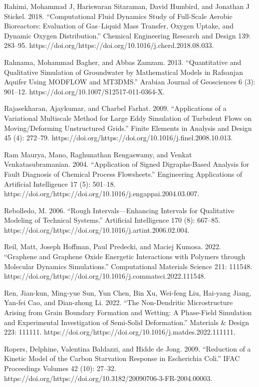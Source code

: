 \documentclass[utf8]{gradu3}
\begin{document}
Rahimi, Mohammad J, Hariswaran Sitaraman, David Humbird, and Jonathan J Stickel. 2018. “Computational Fluid Dynamics Study of Full-Scale Aerobic Bioreactors: Evaluation of Gas–Liquid Mass Transfer, Oxygen Uptake, and Dynamic Oxygen Distribution.” Chemical Engineering Research and Design 139: 283–95. https://doi.org/https://doi.org/10.1016/j.cherd.2018.08.033.

Rahnama, Mohammad Bagher, and Abbas Zamzam. 2013. “Quantitative and Qualitative Simulation of Groundwater by Mathematical Models in Rafsanjan Aquifer Using MODFLOW and MT3DMS.” Arabian Journal of Geosciences 6 (3): 901–12. https://doi.org/10.1007/S12517-011-0364-X.

Rajasekharan, Ajaykumar, and Charbel Farhat. 2009. “Applications of a Variational Multiscale Method for Large Eddy Simulation of Turbulent Flows on Moving/Deforming Unstructured Grids.” Finite Elements in Analysis and Design 45 (4): 272–79. https://doi.org/https://doi.org/10.1016/j.finel.2008.10.013.

Ram Maurya, Mano, Raghunathan Rengaswamy, and Venkat Venkatasubramanian. 2004. “Application of Signed Digraphs-Based Analysis for Fault Diagnosis of Chemical Process Flowsheets.” Engineering Applications of Artificial Intelligence 17 (5): 501–18. https://doi.org/https://doi.org/10.1016/j.engappai.2004.03.007.

Rebolledo, M. 2006. “Rough Intervals—Enhancing Intervals for Qualitative Modeling of Technical Systems.” Artificial Intelligence 170 (8): 667–85. https://doi.org/https://doi.org/10.1016/j.artint.2006.02.004.

Reil, Matt, Joseph Hoffman, Paul Predecki, and Maciej Kumosa. 2022. “Graphene and Graphene Oxide Energetic Interactions with Polymers through Molecular Dynamics Simulations.” Computational Materials Science 211: 111548. https://doi.org/https://doi.org/10.1016/j.commatsci.2022.111548.

Ren, Jian-kun, Ming-yue Sun, Yun Chen, Bin Xu, Wei-feng Liu, Hai-yang Jiang, Yan-fei Cao, and Dian-zhong Li. 2022. “The Non-Dendritic Microstructure Arising from Grain Boundary Formation and Wetting: A Phase-Field Simulation and Experimental Investigation of Semi-Solid Deformation.” Materials \& Design 223: 111111. https://doi.org/https://doi.org/10.1016/j.matdes.2022.111111.

Ropers, Delphine, Valentina Baldazzi, and Hidde de Jong. 2009. “Reduction of a Kinetic Model of the Carbon Starvation Response in Escherichia Coli.” IFAC Proceedings Volumes 42 (10): 27–32. https://doi.org/https://doi.org/10.3182/20090706-3-FR-2004.00003.
\end{document}
